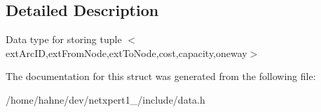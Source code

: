 \subsection{Detailed Description}
Data type for storing tuple $<$ext\+Arc\+ID,ext\+From\+Node,ext\+To\+Node,cost,capacity,oneway$>$ 

The documentation for this struct was generated from the following file\+:\begin{DoxyCompactItemize}
\item 
/home/hahne/dev/netxpert1\+\_/include/data.\+h\end{DoxyCompactItemize}
